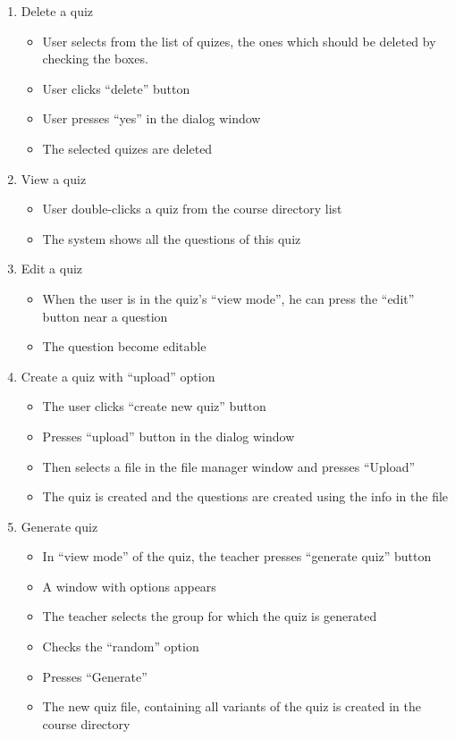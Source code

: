 \begin{enumerate}
  \item Delete a quiz
  \begin{itemize}
    \item User selects from the list of quizes, the ones which should be deleted by checking the boxes.
    \item User clicks “delete” button
    \item User presses “yes” in the dialog window
    \item The selected quizes are deleted
  \end{itemize}    

  \item View a quiz
  \begin{itemize}
    \item User double-clicks a quiz from the course directory list
    \item The system shows all the questions of this quiz
  \end{itemize}    

  \item Edit a quiz
  \begin{itemize}
    \item When the user is in the quiz’s “view mode”, he can press the “edit” button near a question
    \item The question become editable
  \end{itemize}    

  \item Create a quiz with “upload” option
  \begin{itemize}
    \item The user clicks “create new quiz” button
    \item Presses “upload” button in the dialog window
    \item Then selects a file in the file manager window and presses “Upload”
    \item The quiz is created and the questions are created using the info in the file
  \end{itemize}

  \item Generate quiz
  \begin{itemize}
    \item In “view mode” of the quiz, the teacher presses “generate quiz” button
    \item A window with options appears
    \item The teacher selects the group for which the quiz is generated
    \item Checks the “random” option
    \item Presses “Generate”
    \item The new quiz file, containing all variants of the quiz is created in the course directory
  \end{itemize}


\end{enumerate}
